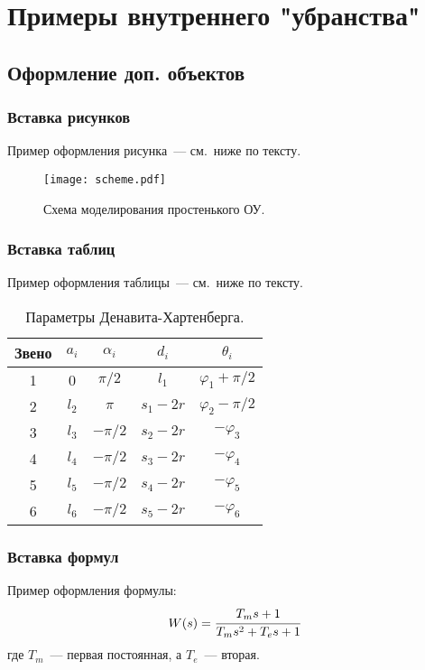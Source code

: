 \section{Примеры внутреннего "убранства"}\label{part_example_of_doc_inside}
\subsection{Оформление доп. объектов}\label{part_pasting_of_extra_objects}
\subsubsection{Вставка рисунков}\label{part_pasting_of_figures}
Пример оформления рисунка~--- см.~ниже по тексту.

\begin{figure}[h]
	\centering
	\texttt{[image: scheme.pdf]}
	\caption{Схема моделирования простенького ОУ.}
	\label{figure_just_example}
\end{figure}


\subsubsection{Вставка таблиц}\label{part_pasting_of_tables}
Пример оформления таблицы~--- см.~ниже по тексту.

\begin{table}[h]
	\caption{Параметры Денавита-Хартенберга.}
	\begin{tabular}{|c|c|c|c|c|}
		\hline
		Звено & $a_i$ & $\alpha_i$ & $d_i$ & $\theta_i$\\
		\hline
		1 & 0 & $\pi/2$ & $l_1$ & $\varphi_1+\pi/2$\\
		\hline
		2  & $l_2$ & $\pi$ & $s_1-2r$ & $\varphi_2-\pi/2$\\
		\hline
		3 & $l_3$ & $-\pi/2$ & $s_2-2r$ & $-\varphi_3$\\
		\hline
		4 & $l_4$ & $-\pi/2$ & $s_3-2r$ & $-\varphi_4$\\
		\hline
		5 & $l_5$ & $-\pi/2$ & $s_4-2r$ & $-\varphi_5$\\
		\hline
		6 & $l_6$ & $-\pi/2$ & $s_5-2r$ & $-\varphi_6$\\
		\hline
	\end{tabular}
	\label{table_DH_params}
\end{table}


\subsubsection{Вставка формул}\label{part_pasting_of_formulas}
Пример оформления формулы:
\begin{equation}\label{eq_example_of_formula}
	W(s) = \cfrac{T_ms+1}{T_ms^2+T_es+1}
\end{equation}
где $T_m$~--- первая постоянная, а $T_e$~--- вторая.

